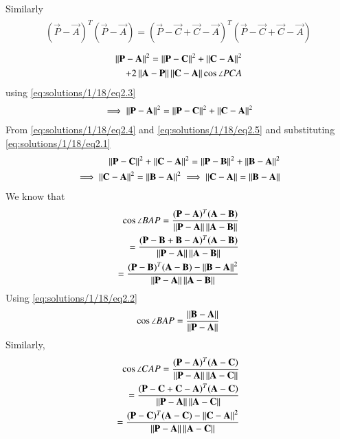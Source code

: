 Similarly
\begin{align}
 \begin{split}
(\vec{P}-\vec{A})^T(\vec{P}-\vec{A})=(\vec{P}-\vec{C}+\vec{C}-\vec{A})^T(\vec{P}-\vec{C}+\vec{C}-\vec{A})
\end{split}
\end{align}
\begin{align}
 \begin{split}
\left\lVert\mathbf{P-A}\right\rVert^2=\left\lVert\mathbf{P-C}\right\rVert^2+\left\lVert\mathbf{C-A}\right\rVert^2\\ 
+2\left\lVert\mathbf{A}-\mathbf{P}\right\rVert\left\lVert\mathbf{C}-\mathbf{A}\right\rVert\cos\angle PCA \\
\end{split}
\end{align}
using \eqref{eq:solutions/1/18/eq2.3}
\begin{align}
 \begin{split}
 \implies \left\lVert\mathbf{P-A}\right\rVert^2=\left\lVert\mathbf{P-C}\right\rVert^2+\left\lVert\mathbf{C-A}\right\rVert^2 \label{eq:solutions/1/18/eq2.5}
 \end{split}
\end{align}
From \eqref{eq:solutions/1/18/eq2.4} and \eqref{eq:solutions/1/18/eq2.5} and substituting \eqref{eq:solutions/1/18/eq2.1}
\begin{align}
\left\lVert\mathbf{P-C}\right\rVert^2+\left\lVert\mathbf{C-A}\right\rVert^2=\left\lVert\mathbf{P-B}\right\rVert^2+\left\lVert\mathbf{B-A}\right\rVert^2 \\
\implies \left\lVert\mathbf{C-A}\right\rVert^2=\left\lVert\mathbf{B-A}\right\rVert^2
\implies \left\lVert\mathbf{C-A}\right\rVert=\left\lVert\mathbf{B-A}\right\rVert \label{eq:solutions/1/18/eq2.6}
\end{align}
We know that 
\begin{align}
 \cos\angle BAP=
   \frac{(\mathbf P -\mathbf A)^T(\mathbf{A}-\mathbf{B})}{\left\lVert\mathbf{P}-\mathbf{A}\right\rVert \left\lVert\mathbf{A}-\mathbf{B}\right\rVert } \\
   =  \frac{(\mathbf P -\mathbf{B} +\mathbf{B} -\mathbf A)^T(\mathbf{A}-\mathbf{B})}{\left\lVert\mathbf{P}-\mathbf{A}\right\rVert \left\lVert\mathbf{A}-\mathbf{B}\right\rVert } \\
   =\frac{(\mathbf P -\mathbf B)^T (\mathbf{A}-\mathbf{B})- \left\lVert\mathbf{B-A}\right\rVert^2}{\left\lVert\mathbf{P}-\mathbf{A}\right\rVert \left\lVert\mathbf{A}-\mathbf{B}\right\rVert }
\end{align}
Using \eqref{eq:solutions/1/18/eq2.2}
\begin{align}
\cos\angle BAP=  \frac{\left\lVert\mathbf{B-A}\right\rVert}{\left\lVert\mathbf{P}-\mathbf{A}\right\rVert  }\label{eq:solutions/1/18/eq2.7}
\end{align}
Similarly,
\begin{align}
 \cos\angle CAP =
 \frac{(\mathbf P -\mathbf A)^T(\mathbf{A}-\mathbf{C})}{\left\lVert\mathbf{P}-\mathbf{A}\right\rVert \left\lVert\mathbf{A}-\mathbf{C}\right\rVert } \\
   =  \frac{(\mathbf P -\mathbf{C} +\mathbf{C} -\mathbf A)^T(\mathbf{A}-\mathbf{C})}{\left\lVert\mathbf{P}-\mathbf{A}\right\rVert \left\lVert\mathbf{A}-\mathbf{C}\right\rVert } \\
   =\frac{(\mathbf P -\mathbf C)^T (\mathbf{A}-\mathbf{C})- \left\lVert\mathbf{C-A}\right\rVert^2}{\left\lVert\mathbf{P}-\mathbf{A}\right\rVert \left\lVert\mathbf{A}-\mathbf{C}\right\rVert }
\end{align}
